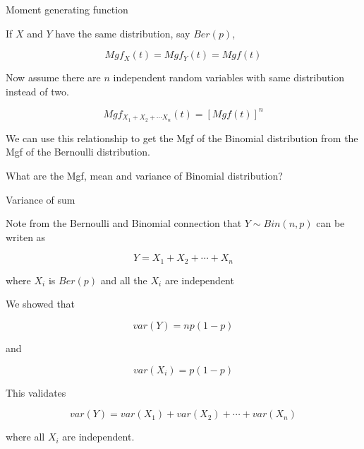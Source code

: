 \documentclass{beamer}\usepackage[]{graphicx}\usepackage[]{color}
\begin{document}
\begin{frame}{Moment generating function}

If $X$ and $Y$ have the same distribution, say $Ber(p)$,

$$ Mgf_{X}(t) = Mgf_{Y}(t) = Mgf(t)  $$ \pause \newline

Now assume there are $n$ independent random variables with same distribution instead of two. \pause

$$ Mgf_{X_1 + X_2 + \cdots X_{n}}(t) = \left [ Mgf(t) \right]^{n} $$ \pause

We can use this relationship to get the Mgf of the Binomial distribution from the Mgf of the Bernoulli distribution. \pause \newline 

What are the Mgf, mean and variance of Binomial distribution?

 \end{frame}

\begin{frame}{Variance of sum}

Note from the Bernoulli and Binomial connection that $ Y \sim Bin(n,p)$ can be writen as 

$$ Y = X_1 + X_2 + \cdots + X_{n} $$

where $X_i$ is $Ber(p)$ and all the $X_i$ are independent 

We showed that 

$$ var(Y) = np (1-p) $$

and 

$$ var(X_i) = p(1-p) $$

This validates 

$$ var(Y) = var(X_1) + var(X_2) + \cdots + var(X_n) $$

where all $X_i$ are independent.

\end{frame}
\end{document}
